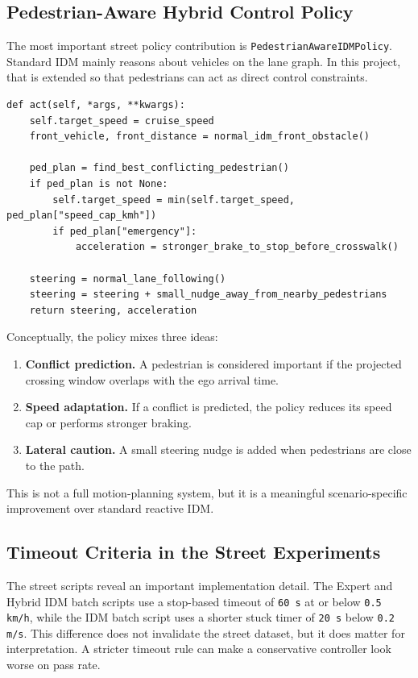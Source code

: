 \documentclass[12pt,a4paper]{report}
\begin{document}
\subsection{Pedestrian-Aware Hybrid Control Policy}
The most important street policy contribution is \texttt{PedestrianAwareIDMPolicy}. Standard IDM mainly reasons about vehicles on the lane graph. In this project, that is extended so that pedestrians can act as direct control constraints.

\begin{lstlisting}[caption={Simplified decision logic of the pedestrian-aware IDM policy.},label={lst:ped_idm_logic},float=H]
def act(self, *args, **kwargs):
    self.target_speed = cruise_speed
    front_vehicle, front_distance = normal_idm_front_obstacle()

    ped_plan = find_best_conflicting_pedestrian()
    if ped_plan is not None:
        self.target_speed = min(self.target_speed, ped_plan["speed_cap_kmh"])
        if ped_plan["emergency"]:
            acceleration = stronger_brake_to_stop_before_crosswalk()

    steering = normal_lane_following()
    steering = steering + small_nudge_away_from_nearby_pedestrians
    return steering, acceleration
\end{lstlisting}

Conceptually, the policy mixes three ideas:

\begin{enumerate}[label=\arabic*.]
    \item \textbf{Conflict prediction.} A pedestrian is considered important if the projected crossing window overlaps with the ego arrival time.
    \item \textbf{Speed adaptation.} If a conflict is predicted, the policy reduces its speed cap or performs stronger braking.
    \item \textbf{Lateral caution.} A small steering nudge is added when pedestrians are close to the path.
\end{enumerate}

This is not a full motion-planning system, but it is a meaningful scenario-specific improvement over standard reactive IDM.

\subsection{Timeout Criteria in the Street Experiments}
The street scripts reveal an important implementation detail. The Expert and Hybrid IDM batch scripts use a stop-based timeout of \texttt{60 s} at or below \texttt{0.5 km/h}, while the IDM batch script uses a shorter stuck timer of \texttt{20 s} below \texttt{0.2 m/s}. This difference does not invalidate the street dataset, but it does matter for interpretation. A stricter timeout rule can make a conservative controller look worse on pass rate.
\end{document}
